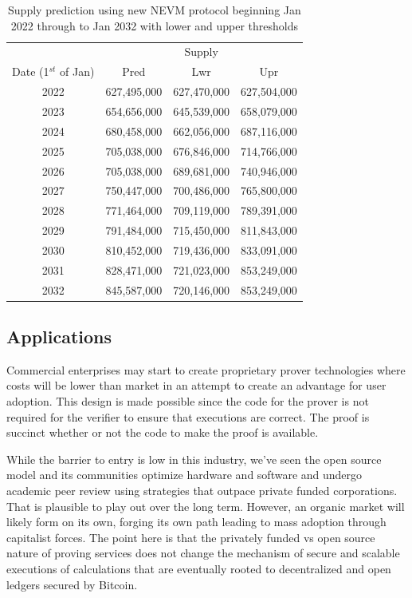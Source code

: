 \documentclass[peerreview]{ieeesyscoin}
\begin{document}
\begin{table}[h!]
\centering
\begin{tabular}{ |c|c|c|c| } 
\hline
 & \multicolumn{3}{|c|}{ Supply } \\
 Date (1$^{st}$ of Jan) & Pred & Lwr & Upr \\
\hline
2022 & 627,495,000 & 627,470,000 & 627,504,000 \\
2023 & 654,656,000 & 645,539,000 & 658,079,000 \\
2024 & 680,458,000 & 662,056,000 & 687,116,000 \\
2025 & 705,038,000  & 676,846,000 & 714,766,000 \\
2026 & 705,038,000  & 689,681,000 & 740,946,000 \\
2027 & 750,447,000 & 700,486,000 & 765,800,000 \\
2028 & 771,464,000 & 709,119,000 & 789,391,000 \\
2029 & 791,484,000 & 715,450,000 & 811,843,000 \\
2030 & 810,452,000 & 719,436,000 & 833,091,000 \\
2031 & 828,471,000 & 721,023,000 & 853,249,000 \\
2032 & 845,587,000 & 720,146,000 & 853,249,000 \\
\hline
\end{tabular}
\caption{Supply prediction using new NEVM protocol beginning Jan 2022 through to Jan 2032 with lower and upper thresholds}
\label{table:pow_vs_pos}
\end{table}

\subsection{Applications}

Commercial enterprises may start to create proprietary prover technologies where costs will be lower than market in an attempt to create an advantage for user adoption. This design is made possible since the code for the prover is not required for the verifier to ensure that executions are correct. The proof is succinct whether or not the code to make the proof is available.

While  the barrier to entry is low in this industry, we’ve seen the open source model and its communities optimize hardware and software and undergo academic peer review using strategies  that outpace private funded corporations. That is plausible to play out over the long term. However, an organic market will likely form on its own, forging its own path leading to mass adoption through capitalist forces. The point here is that the privately funded vs open source nature of proving services does not change the mechanism of secure and scalable executions of calculations that are eventually rooted to decentralized and open ledgers secured by Bitcoin.
\end{document}
